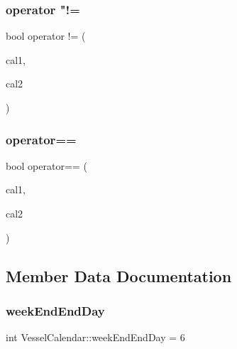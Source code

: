 \subsubsection{\texorpdfstring{operator "!=}{operator !=}}
{\footnotesize\ttfamily bool operator != (\begin{DoxyParamCaption}\item[{const \mbox{\hyperlink{struct_vessel_calendar}{Vessel\+Calendar}} \&}]{cal1,  }\item[{const \mbox{\hyperlink{struct_vessel_calendar}{Vessel\+Calendar}} \&}]{cal2 }\end{DoxyParamCaption})\hspace{0.3cm}{\ttfamily [friend]}}

\mbox{\label{struct_vessel_calendar_a3e5b4ef27567f66ecc6b0414afd4a084}} 
\subsubsection{\texorpdfstring{operator==}{operator==}}
{\footnotesize\ttfamily bool operator== (\begin{DoxyParamCaption}\item[{const \mbox{\hyperlink{struct_vessel_calendar}{Vessel\+Calendar}} \&}]{cal1,  }\item[{const \mbox{\hyperlink{struct_vessel_calendar}{Vessel\+Calendar}} \&}]{cal2 }\end{DoxyParamCaption})\hspace{0.3cm}{\ttfamily [friend]}}



\subsection{Member Data Documentation}
\mbox{\label{struct_vessel_calendar_a0d1a1fd59839aa594810b03b6cd8942b}} 
\subsubsection{\texorpdfstring{weekEndEndDay}{weekEndEndDay}}
{\footnotesize\ttfamily int Vessel\+Calendar\+::week\+End\+End\+Day = 6}

